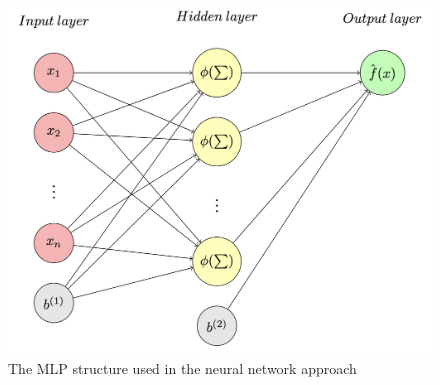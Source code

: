 \documentclass[%
]{ittmm}
\begin{document}
\begin{figure}[h!]
    \centering
        
        
        
        
        
        

        
    \includegraphics[width=0.4\linewidth]{structre-as-photo.png}
    \caption{The MLP structure used in the neural network approach}
    \label{fig:structure}
\end{figure}
\end{document}
